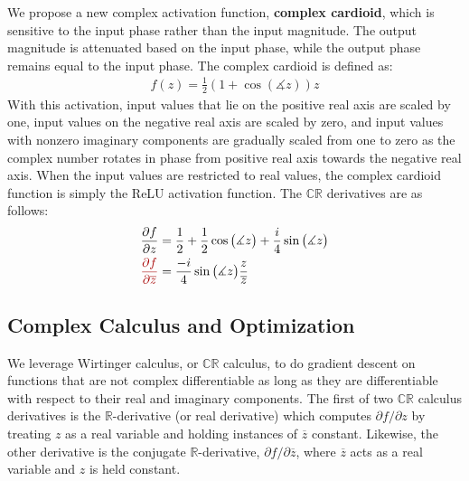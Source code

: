 \documentclass{article}
\newcommand*\conj[1]{\overline{#1}}
\renewcommand{\angle}{\measuredangle}
\begin{document}
We propose a new complex activation function, \textbf{complex cardioid}, which is sensitive to the input phase rather than the input magnitude. The output magnitude is attenuated based on the input phase, while the output phase remains equal to the input phase. The complex cardioid is defined as:
\begin{align}
f(z)  = \frac12 ( 1 + \cos(\angle z) ) z
\end{align}
With this activation, input values that lie on the positive real axis are scaled by one, input values on the negative real axis are scaled by zero, and input values with nonzero imaginary components are gradually scaled from one to zero as the complex number rotates in phase from positive real axis towards the negative real axis. When the input values are restricted to real values, the complex cardioid function is simply the ReLU activation function.
The $\mathbb{CR}$ \cite{cr_calculus} derivatives are as follows:
\begin{align}
\frac{\partial f}{\partial z} &= \frac12 + \frac12 \cos\big(\angle z\big) + \frac{i}{4} \sin\big(\angle z\big) \\
{\color{red}\frac{\partial f}{\partial \conj{z}}} &= \frac{-i}{4} \sin\big(\angle z \big) \frac{z}{\conj{z}}
\end{align}


\subsection{Complex Calculus and Optimization}

We leverage Wirtinger calculus, or $\mathbb{CR}$ calculus, \cite{wirtinger,cr_calculus} to do gradient descent on functions that are not complex differentiable as long as they are differentiable with respect to their real and imaginary components. The first of two $\mathbb{CR}$ calculus derivatives is the $\mathbb{R}$-derivative (or real derivative) which computes $\partial f/\partial z$ by treating $z$ as a real variable and holding instances of $\conj{z}$ constant. Likewise, the other derivative is the {\color{red}conjugate $\mathbb{R}$-derivative}, {\color{red}$\partial f/\partial \conj{z}$}, where $\conj{z}$ acts as a real variable and $z$ is held constant.
\end{document}
